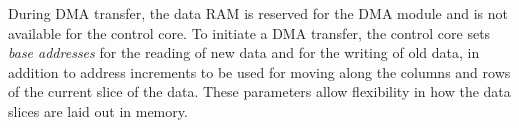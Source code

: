 During \ac{DMA} transfer, the data \ac{RAM} is reserved for the \ac{DMA} module
and is not available for the control core. To initiate a \ac{DMA} transfer, the
control core sets \emph{base addresses} for the reading of new data and for the
writing of old data, in addition to address increments to be used for moving
along the columns and rows of the current slice of the data. These parameters
allow flexibility in how the data slices are laid out in memory.
